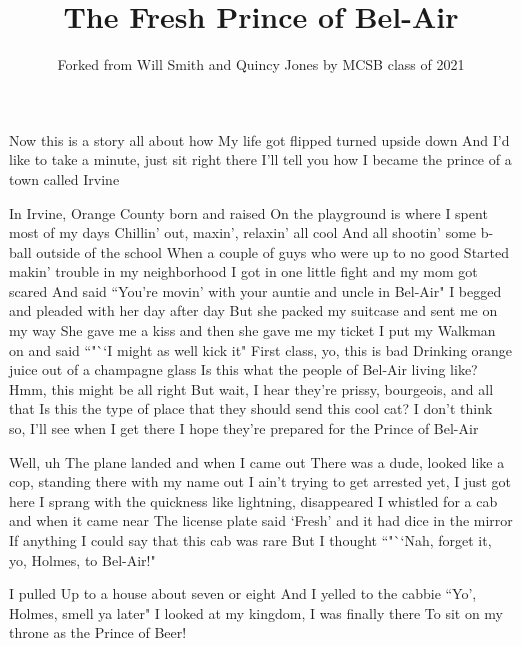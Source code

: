 \documentclass{article}
\title{The Fresh Prince of Bel-Air}
\author{Forked from Will Smith and Quincy Jones by MCSB class of 2021}
\begin{document}
\maketitle

Now this is a story all about how
My life got flipped turned upside down
And I'd like to take a minute, just sit right there
I'll tell you how I became the prince of a town called Irvine

In Irvine, Orange County born and raised
On the playground is where I spent most of my days
Chillin' out, maxin', relaxin' all cool
And all shootin' some b-ball outside of the school
When a couple of guys who were up to no good
Started makin' trouble in my neighborhood
I got in one little fight and my mom got scared
And said ``You're movin' with your auntie and uncle in Bel-Air"
I begged and pleaded with her day after day
But she packed my suitcase and sent me on my way
She gave me a kiss and then she gave me my ticket
I put my Walkman on and said ``"``I might as well kick it"
First class, yo, this is bad
Drinking orange juice out of a champagne glass
Is this what the people of Bel-Air living like?
Hmm, this might be all right
But wait, I hear they're prissy, bourgeois, and all that
Is this the type of place that they should send this cool cat?
I don't think so, I'll see when I get there
I hope they're prepared for the Prince of Bel-Air

Well, uh
The plane landed and when I came out
There was a dude, looked like a cop, standing there with my name out
I ain't trying to get arrested yet, I just got here
I sprang with the quickness like lightning, disappeared
I whistled for a cab and when it came near
The license plate said `Fresh' and it had dice in the mirror
If anything I could say that this cab was rare
But I thought ``"``Nah, forget it, yo, Holmes, to Bel-Air!"

I pulled
Up to a house about seven or eight
And I yelled to the cabbie ``Yo', Holmes, smell ya later"
I looked at my kingdom, I was finally there
To sit on my throne as the Prince of Beer!
\end{document}
